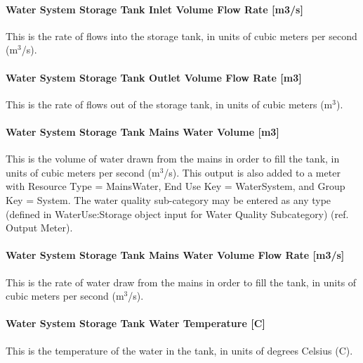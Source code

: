 \paragraph{Water System Storage Tank Inlet Volume Flow Rate {[}m3/s{]}}\label{water-system-storage-tank-inlet-volume-flow-rate-m3s}

This is the rate of flows into the storage tank, in units of cubic meters per second (m\(^{3}\)/s).

\paragraph{Water System Storage Tank Outlet Volume Flow Rate {[}m3{]}}\label{water-system-storage-tank-outlet-volume-flow-rate-m3}

This is the rate of flows out of the storage tank, in units of cubic meters (m\(^{3}\)).

\paragraph{Water System Storage Tank Mains Water Volume {[}m3{]}}\label{water-system-storage-tank-mains-water-volume-m3}

This is the volume of water drawn from the mains in order to fill the tank, in units of cubic meters per second (m\(^{3}\)/s). This output is also added to a meter with Resource Type = MainsWater, End Use Key = WaterSystem, and Group Key = System. The water quality sub-category may be entered as any type (defined in WaterUse:Storage object input for Water Quality Subcategory) (ref. Output Meter).

\paragraph{Water System Storage Tank Mains Water Volume Flow Rate {[}m3/s{]}}\label{water-system-storage-tank-mains-water-volume-flow-rate-m3s}

This is the rate of water draw from the mains in order to fill the tank, in units of cubic meters per second (m\(^{3}\)/s).

\paragraph{Water System Storage Tank Water Temperature {[}C{]}}\label{water-system-storage-tank-water-temperature-c}

This is the temperature of the water in the tank, in units of degrees Celsius (C).

